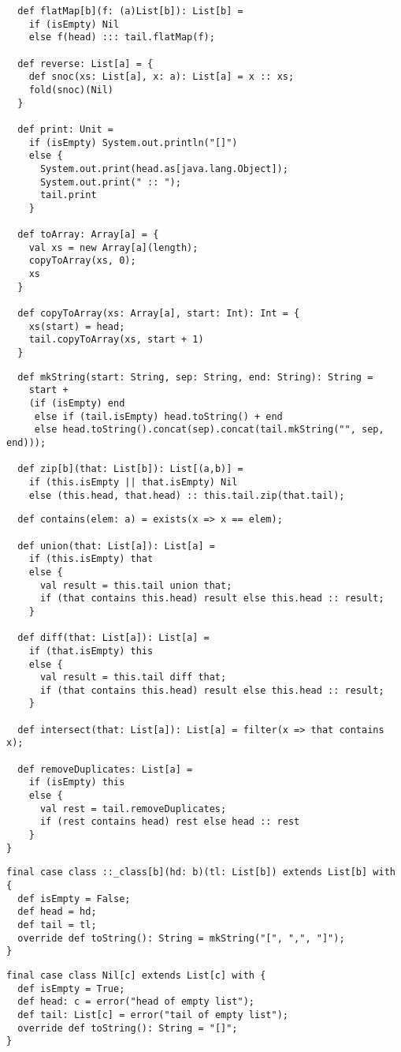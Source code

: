 \documentclass[11pt]{report}
\begin{document}
\begin{verbatim}
  def flatMap[b](f: (a)List[b]): List[b] =
    if (isEmpty) Nil
    else f(head) ::: tail.flatMap(f);

  def reverse: List[a] = {
    def snoc(xs: List[a], x: a): List[a] = x :: xs;
    fold(snoc)(Nil)
  }

  def print: Unit =
    if (isEmpty) System.out.println("[]")
    else {
      System.out.print(head.as[java.lang.Object]);
      System.out.print(" :: ");
      tail.print
    }

  def toArray: Array[a] = {
    val xs = new Array[a](length);
    copyToArray(xs, 0);
    xs
  }

  def copyToArray(xs: Array[a], start: Int): Int = {
    xs(start) = head;
    tail.copyToArray(xs, start + 1)
  }
\end{verbatim}
\begin{verbatim}
  def mkString(start: String, sep: String, end: String): String =
    start +
    (if (isEmpty) end
     else if (tail.isEmpty) head.toString() + end
     else head.toString().concat(sep).concat(tail.mkString("", sep, end)));

  def zip[b](that: List[b]): List[(a,b)] =
    if (this.isEmpty || that.isEmpty) Nil
    else (this.head, that.head) :: this.tail.zip(that.tail);
\end{verbatim}
\begin{verbatim}
  def contains(elem: a) = exists(x => x == elem);

  def union(that: List[a]): List[a] =
    if (this.isEmpty) that
    else {
      val result = this.tail union that;
      if (that contains this.head) result else this.head :: result;
    }

  def diff(that: List[a]): List[a] =
    if (that.isEmpty) this
    else {
      val result = this.tail diff that;
      if (that contains this.head) result else this.head :: result;
    }

  def intersect(that: List[a]): List[a] = filter(x => that contains x);

  def removeDuplicates: List[a] =
    if (isEmpty) this
    else {
      val rest = tail.removeDuplicates;
	  if (rest contains head) rest else head :: rest
    }
}
\end{verbatim}
\begin{verbatim}
final case class ::_class[b](hd: b)(tl: List[b]) extends List[b] with {
  def isEmpty = False;
  def head = hd;
  def tail = tl;
  override def toString(): String = mkString("[", ",", "]");
}
\end{verbatim}
\begin{verbatim}
final case class Nil[c] extends List[c] with {
  def isEmpty = True;
  def head: c = error("head of empty list");
  def tail: List[c] = error("tail of empty list");
  override def toString(): String = "[]";
}
\end{verbatim}
\end{document}
